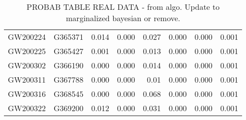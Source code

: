 \begin{table}[]
\begin{tabular}{c|c|ccr|ccr}
GW200224                      & G365371               & 0.014                   & 0.000                    & 0.027                   & 0.000                   & 0.000                    & 0.001                   \\
GW200225                      & G365427               & 0.001                   & 0.000                    & 0.013                   & 0.000                   & 0.000                    & 0.001                   \\
GW200302                      & G366190               & 0.000                   & 0.000                    & 0.014                   & 0.000                   & 0.000                    & 0.001                   \\
GW200311                      & G367788               & 0.000                   & 0.000                    & 0.01                    & 0.000                   & 0.000                    & 0.001                   \\
GW200316                      & G368545               & 0.000                   & 0.000                    & 0.068                   & 0.000                   & 0.000                    & 0.001                   \\
GW200322                      & G369200               & 0.012                   & 0.000                    & 0.031                   & 0.000                   & 0.000                    & 0.001                   \\ \cline{1-1} \cline{3-4} \cline{6-7}
\hline
\end{tabular}
\caption{PROBAB TABLE REAL DATA - from algo. Update to marginalized bayesian or remove.}
\label{tab:real_data}
\end{table}



